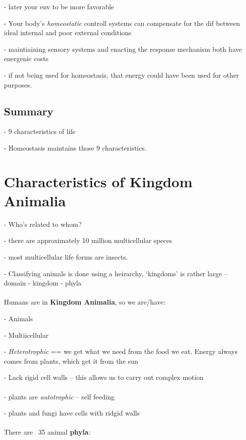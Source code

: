 \documentclass{article}
\theoremstyle{definition}
\begin{document}
\indent\indent - later your env to be more favorable

\indent\indent - Your body's \textit{homeostatic}  controll systems can compensate for the dif between ideal internal and poor external conditions

- maintiaining sensory systems and enacting the response mechanism both have energenic costs

- if not being used for homeostasis, that energy could have been used for other purposes.

\subsection{Summary}

- 9 characteristics of life 

- Homeostasis maintains those 9 characteristics.

\section{Characteristics of Kingdom Animalia}

- Who's related to whom?

- there are approximately 10 million multicellular speces

- most multicellular life forms are insects.

- Classifying animals is done using a heirarchy, `kingdoms' is rather large
-- domain - kingdom - phyla
\\~\\


Humans are in \textbf{Kingdom Animalia}, so we are/have:

\indent\indent- Animals

\indent\indent- Multiicellular

\indent\indent- \textit{Heterotrophic} == we get what we need from the food we eat. Energy always comes from plants, which get it from the sun

\indent\indent- Lack rigid cell walls -- this allows us to carry out complex motion\\~\\

- plants are \textit{autotrophic} -- self feeding

- plants and fungi have cells with ridgid walls\\~\\

There are ~35 animal \textbf{phyla}:
\end{document}
